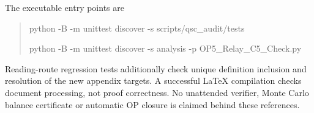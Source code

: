 The executable entry points are
\begin{quote}\small\ttfamily
python -B -m unittest discover -s scripts/qsc\_audit/tests\par
python -B -m unittest discover -s analysis -p OP5\_Relay\_C5\_Check.py
\end{quote}
Reading-route regression tests additionally check unique definition
inclusion and resolution of the new appendix targets. A successful
LaTeX compilation checks document processing, not proof correctness.
No unattended verifier, Monte Carlo balance certificate or automatic
OP closure is claimed behind these references.
